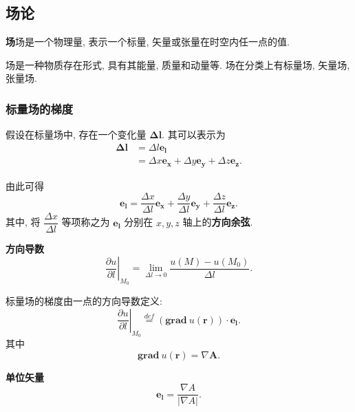 \subsection{场论}

\textbf{场}\quad 场是一个物理量, 表示一个标量, 矢量或张量在时空内任一点的值.

场是一种物质存在形式, 具有其能量, 质量和动量等. 场在分类上有标量场, 矢量场, 张量场.

\subsubsection{标量场的梯度}
假设在标量场中, 存在一个变化量 $\bm{\Delta l}$. 其可以表示为
\begin{equation}
    \begin{aligned}
        \bm{\Delta l} & =\Delta l\bm{e_l}                                    \\
                      & =\Delta x\bm{e_x}+\Delta y\bm{e_y}+\Delta z\bm{e_z}.
    \end{aligned}
\end{equation}

由此可得
\begin{equation}
    \bm{e_l}=\frac{\Delta x}{\Delta l}\bm{e_x}+\frac{\Delta y}{\Delta l}\bm{e_y}+\frac{\Delta z}{\Delta l}\bm{e_z}.
\end{equation}
其中, 将 $\dfrac{\Delta x}{\Delta l}$ 等项称之为 $\bm{e_l}$ 分别在 $x,y,z$ 轴上的\textbf{方向余弦}.

\textbf{方向导数}
\begin{equation}
    \left.\frac{\partial u}{\partial l}\right|_{M_0}=\lim_{\Delta l\rightarrow 0}\frac{u(M)-u(M_0)}{\Delta l}.
\end{equation}

标量场的梯度由一点的方向导数定义:
\begin{equation}
    \left.\frac{\partial u}{\partial l}\right|_{M_0}\stackrel{def}{=}(\textbf{grad}\ u(\bm{r}))\cdot\bm{e_l}.
\end{equation}
其中
\begin{equation}
    \textbf{grad}\ u(\bm{r})=\nabla\bm{A}.
\end{equation}

\textbf{单位矢量}
\begin{equation}
    \bm{e_l}=\frac{\nabla A}{|\nabla A|}.
\end{equation}

